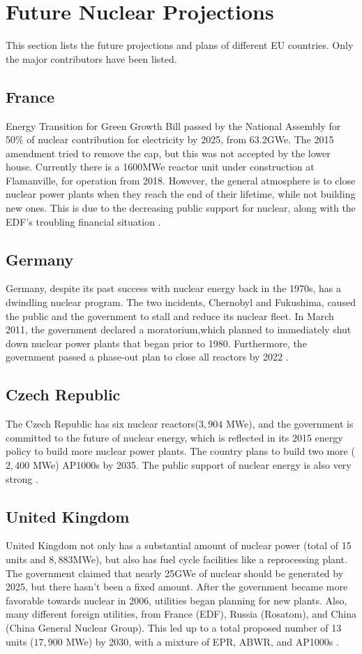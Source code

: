 \section{Future Nuclear Projections}
This section lists the future projections and plans of
different EU countries. Only the major contributors have been listed.

\subsection{France}
Energy Transition for Green Growth Bill passed by the National Assembly for 50\% of
nuclear contribution for electricity by 2025, from 63.2GWe. The 2015 amendment tried to remove
the cap, but this was not accepted by the lower house. Currently there is a
1600MWe reactor unit under construction at Flamanville, for operation from 2018.
However, the general atmosphere is to close nuclear power plants when they reach the end
of their lifetime, while not building new ones. This is due to the decreasing
public support for nuclear, along with the \gls{EDF}'s troubling financial situation \cite{noauthor_nuclear_2017}.

\subsection{Germany}
Germany, despite its past success with nuclear energy back in the 1970s,
has a dwindling nuclear program. The two incidents, Chernobyl and Fukushima,
caused the public and the government to stall and reduce its nuclear fleet.
In March 2011, the government declared a moratorium,which planned to immediately
shut down nuclear power plants that began prior to 1980. Furthermore, the government
passed a phase-out plan to close all reactors by 2022 \cite{noauthor_nuclear_2017-1}.

\subsection{Czech Republic}
The Czech Republic has six nuclear reactors($3,904$ MWe), and the government is committed to the
future of nuclear energy, which is reflected in its 2015 energy policy to build 
more nuclear power plants. The country plans to build two more ($2,400$ MWe) AP1000s by 2035.
The public support of nuclear energy is also very strong \cite{noauthor_nuclear_2017-2}.

\subsection{United Kingdom}
United Kingdom not only has a substantial amount of nuclear power (total of 15 units
and $8,883$MWe), but also has fuel cycle facilities like a reprocessing plant. The government
claimed that nearly 25GWe of nuclear should be generated by 2025, but there hasn't been
a fixed amount. After the government became more favorable towards nuclear in 2006, utilities
began planning for new plants. Also, many different foreign utilities, from France (EDF),
Russia (Rosatom), and China (China General Nuclear Group). This led up to a total proposed
number of 13 units ($17,900$ MWe) by 2030, with a mixture of EPR, ABWR, and AP1000s \cite{noauthor_nuclear_2017-3}.

